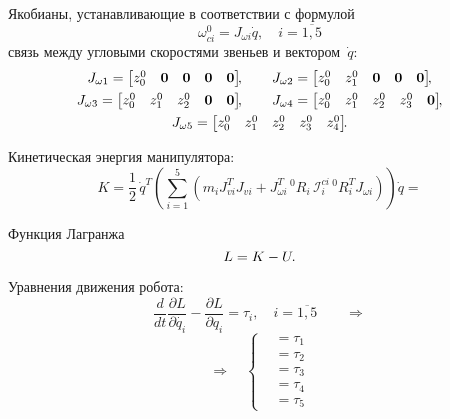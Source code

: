 Якобианы, устанавливающие в соответствии с формулой
\begin{equation}
    \omega^0_{ci} = J_{\omega i}\dot{q}, \quad i = \overline{1,5}
\end{equation}
связь между угловыми скоростями звеньев и вектором~$\dot{q}$:
\begin{gather}
    J_{\omega 1} =
    \begin{bmatrix}
        z^0_0 & \nv & \nv & \nv & \nv
    \end{bmatrix}\!\!,
    \qquad
    J_{\omega 2} =
    \begin{bmatrix}
        z^0_0 & z^0_1 & \nv & \nv & \nv
    \end{bmatrix}\!\!,
    \\
    J_{\omega 3} =
    \begin{bmatrix}
         z^0_0 & z^0_1 & z^0_2 & \nv & \nv
    \end{bmatrix}\!\!,
    \qquad
    J_{\omega 4} =
    \begin{bmatrix}
        z^0_0 & z^0_1 & z^0_2 & z^0_3 & \nv
    \end{bmatrix}\!\!,
    \\
    J_{\omega 5} =
    \begin{bmatrix}
        z^0_0 & z^0_1 & z^0_2 & z^0_3 & z^0_4
    \end{bmatrix}\!\!\ldotp
\end{gather}

Кинетическая энергия манипулятора:
\begin{equation}
    K = \frac{1}{2}\, \dot{q}^T \left( \sum_{i=1}^5 \left( m_i J_{vi}^T J_{vi} + J_{\omega i}^T \, {}^0\!R_i \, \mathcal{I}^{ci}_i \, {}^0\!R_i^T J_{\omega i} \right) \right) \dot{q} =
\end{equation}

Функция Лагранжа
\begin{equation}
    L = K - U\ldotp
\end{equation}

Уравнения движения робота:
\begin{equation}
    \frac{d}{dt}\frac{\partial L}{\partial\dot{q_i}} - \frac{\partial L}{\partial q_i} = \tau_i, \quad i = \overline{1,5} \qquad \Rightarrow
\end{equation}
\begin{equation}
    \Rightarrow \quad
	\left\{
	\begin{aligned}
		\!& = \tau_1\\
		\!& = \tau_2\\
		\!& = \tau_3\\
		\!& = \tau_4\\
		\!& = \tau_5
	\end{aligned}
	\right.
\end{equation}
\newpage
